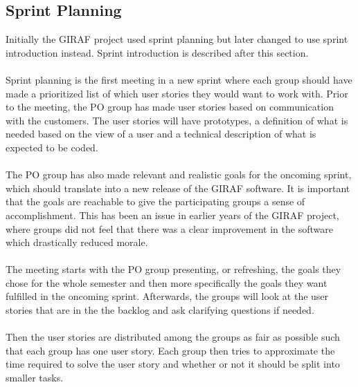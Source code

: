 \subsection{Sprint Planning} \label{subsec:sprint-planning}
Initially the GIRAF project used sprint planning but later changed to use sprint introduction instead.
Sprint introduction is described after this section.
\\
\\
Sprint planning is the first meeting in a new sprint where each group should have made a prioritized list of which user stories they would want to work with.
Prior to the meeting, the PO group has made user stories based on communication with the customers.
The user stories will have prototypes, a definition of what is needed based on the view of a user and a technical description of what is expected to be coded.
\\
\\
The PO group has also made relevant and realistic goals for the oncoming sprint, which should translate into a new release of the GIRAF software.
It is important that the goals are reachable to give the participating groups a sense of accomplishment.
This has been an issue in earlier years of the GIRAF project, where groups did not feel that there was a clear improvement in the software which drastically reduced morale.
\\
\\
The meeting starts with the PO group presenting, or refreshing, the goals they chose for the whole semester and then more specifically the goals they want fulfilled in the oncoming sprint.
Afterwards, the groups will look at the user stories that are in the the backlog and ask clarifying questions if needed.
\\
\\
Then the user stories are distributed among the groups as fair as possible such that each group has one user story.
Each group then tries to approximate the time required to solve the user story and whether or not it should be split into smaller tasks.



